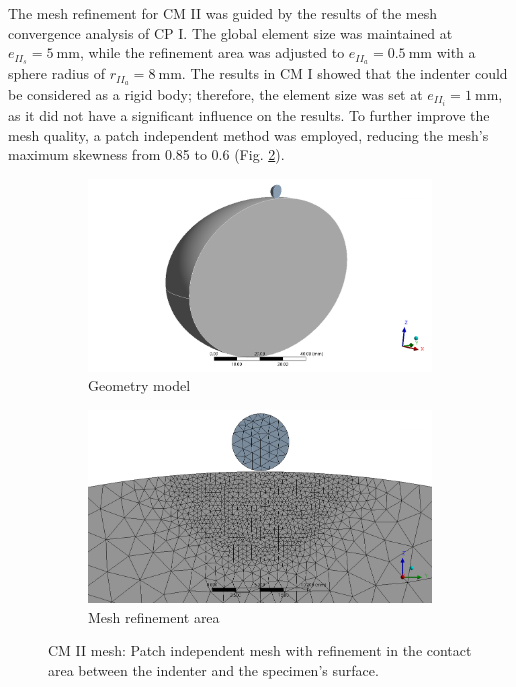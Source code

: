 The mesh refinement for CM II was guided by the results of the mesh convergence analysis of CP I.
The global element size was maintained at $e_{{II}_s}=\SI{5}{\milli\meter}$, while the refinement area
was adjusted to $e_{{II}_a}=\SI{0.5}{\milli\meter}$ with a sphere radius of $r_{{II}_a}=\SI{8}{\milli\meter}$.
The results in CM I showed that the indenter could be considered as a rigid body; therefore, the element size was 
set at $e_{{II}_i}=\SI{1}{\milli\meter}$, as it did not have a significant influence on the results.
To further improve the mesh quality, a patch independent method was employed, reducing the mesh's 
maximum skewness from \SI{0.85}{} to \SI{0.6}{} (Fig. \ref{fig:cm2meshref}).
\begin{figure}
    \centering
    \begin{subfigure}[b]{0.45\textwidth}
    \centering
    \includegraphics[width=\textwidth]{Images/computational/cm2geometry.png}
    \caption{Geometry model}
    \label{fig:cm2meshtotal}
    \end{subfigure}
    \hfill
    \begin{subfigure}[b]{0.45\textwidth}
    \centering
    \includegraphics[width=\textwidth]{Images/computational/cm2meshzoom.png}
    \caption{Mesh refinement area}
    \label{fig:cm2meshref}
    \end{subfigure}
    \hspace{0.3cm}
    \caption[Computational model II mesh]{CM II mesh: Patch independent mesh with refinement in the contact area between the indenter and the specimen's surface.}
    \label{fig:cmIImesh}
\end{figure}

